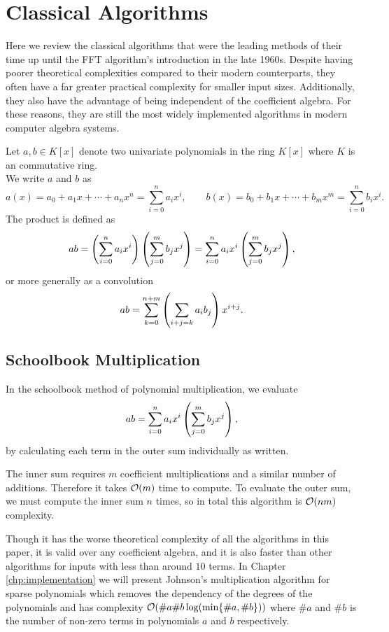 \chapter{Classical Algorithms}\label{chp:classical}

Here we review the classical algorithms that were the leading methods of their time up until the FFT algorithm's introduction in the late 1960s. Despite having poorer theoretical complexities compared to their modern counterparts, they often have a far greater practical complexity for smaller input sizes. Additionally, they also have the advantage of being independent of the coefficient algebra. For these reasons, they are still the most widely implemented algorithms in modern computer algebra systems.

Let $a, b \in K[x]$ denote two univariate polynomials in the ring $K[x]$ where $K$ is an commutative ring.\\
We write $a$ and $b$ as
\[
    a(x) = a_0 + a_1x + \cdots + a_nx^n = \sum^n_{i=0} a_ix^i, \qquad b(x) = b_0 + b_1x + \cdots + b_mx^m = \sum^n_{i=0} b_ix^i.
\]
The product is defined as
\[
    ab = \left(\sum^n_{i=0} a_i x^i\right)\left(\sum^m_{j=0} b_j x^j\right) = \sum^n_{i=0} a_ix^i\left(\sum^m_{j=0} b_j x^j\right),
\]
or more generally as a convolution
\[
    ab = \sum^{n + m}_{k=0} \left(\sum_{i + j = k}a_ib_j\right) x^{i + j}.
\]

\section{Schoolbook Multiplication}
\label{sec:prelim-schoolbook}

In the schoolbook method of polynomial multiplication, we evaluate
\[
    ab = \sum^n_{i=0} a_ix^i\left(\sum^m_{j=0} b_j x^j\right),
\]
by calculating each term in the outer sum individually as written.

The inner sum requires $m$ coefficient multiplications and a similar number of additions. Therefore it takes $\mathcal O(m)$ time to compute. To evaluate the outer sum, we must compute the inner sum $n$ times, so in total this algorithm is $\mathcal O(nm)$ complexity.

Though it has the worse theoretical complexity of all the algorithms in this paper, it is valid over any coefficient algebra, and it is also faster than other algorithms for inputs with less than around $10$ terms. In Chapter \ref{chp:implementation} we will present Johnson's multiplication algorithm for sparse polynomials which removes the dependency of the degrees of the polynomials and has complexity $\mathcal O(\# a \# b \log(\min\{\# a, \# b\}))$ where $\# a$ and $\# b$ is the number of non-zero terms in polynomials $a$ and $b$ respectively.

